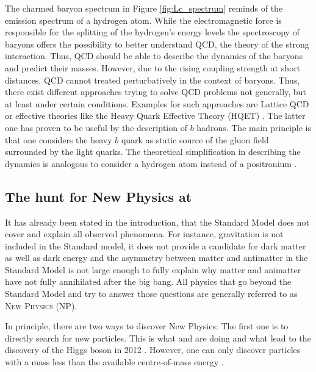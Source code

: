 The charmed baryon spectrum in Figure \ref{fig:Lc_spectrum} reminds of the emission spectrum of a hydrogen atom.
While the electromagnetic force is responsible for the splitting of the hydrogen's energy levels the spectroscopy of baryons offers the possibility to better understand QCD, the theory of the strong interaction.
Thus, QCD should be able to describe the dynamics of the baryons and predict their masses.
However, due to the rising coupling strength \as at short distances, QCD cannot treated perturbatively in the context of baryons.
Thus, there exist different approaches trying to solve QCD problems not generally, but at least under certain conditions.
Examples for such approaches are Lattice QCD \cite{LatticeQCD} or effective theories like the Heavy Quark Effective Theory (HQET) \cite{HQET_Introduction}.
The latter one has proven to be useful by the description of $b$ hadrons.
The main principle is that one considers the heavy $b$ quark as static source of the gluon field surrounded by the light quarks.
The theoretical simplification in describing the dynamics is analogous to consider a hydrogen atom instead of a positronium \cite{HQET_Introduction}.

\subsection{The hunt for New Physics at \lhcb}
It has already been stated in the introduction, that the Standard Model does not cover and explain all observed phenomena.
For instance, gravitation is not included in the Standard model, it does not provide a candidate for dark matter as well as dark energy and the asymmetry between matter and antimatter in the Standard Model is not large enough to fully explain why matter and animatter have not fully annihilated after
the big bang.
All physics that go beyond the Standard Model and try to answer those questions are generally referred to as \textsc{New Physics (NP)}.

In principle, there are two ways to discover New Physics:
The first one is to directly search for new particles.
This is what \atlas and \cms are doing and what lead to the discovery of the Higgs boson in 2012 \cite{Higgs_ATLAS, Higgs_CMS}.
However, one can only discover particles with a mass less than the available centre-of-mass energy \sqs.

